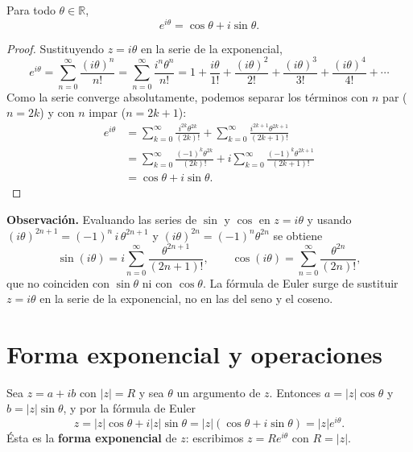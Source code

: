 \documentclass[12pt,a4paper]{book}
\begin{document}
  \begin{teorema}
    Para todo $\theta\in\mathbb{R}$,
    \begin{equation*}
      e^{i\theta}=\cos\theta+i\sin\theta.
    \end{equation*}
  \end{teorema}

  \begin{proof}
    Sustituyendo $z=i\theta$ en la serie de la exponencial,
    \begin{equation*}
      e^{i\theta}=\sum_{n=0}^{\infty}\frac{(i\theta)^n}{n!}=\sum_{n=0}^{\infty}\frac{i^n\theta^n}{n!}=1+\frac{i\theta}{1!}+\frac{(i\theta)^2}{2!}+\frac{(i\theta)^3}{3!}+\frac{(i\theta)^4}{4!}+\cdots
    \end{equation*}
    Como la serie converge absolutamente, podemos separar los términos con $n$ par ($n=2k$) y con $n$ impar ($n=2k+1$):
    \begin{align*}
      e^{i\theta} & =\sum_{k=0}^{\infty}\frac{i^{2k}\theta^{2k}}{(2k)!}+\sum_{k=0}^{\infty}\frac{i^{2k+1}\theta^{2k+1}}{(2k+1)!} \\
                  & =\sum_{k=0}^{\infty}\frac{(-1)^k\theta^{2k}}{(2k)!}+i\sum_{k=0}^{\infty}\frac{(-1)^k\theta^{2k+1}}{(2k+1)!}    \\
                  & =\cos\theta+i\sin\theta.
    \end{align*}
  \end{proof}

  \textbf{Observación.} Evaluando las series de $\sin$ y $\cos$ en $z=i\theta$ y usando $(i\theta)^{2n+1}=(-1)^n\,i\,\theta^{2n+1}$ y $(i\theta)^{2n}=(-1)^n\theta^{2n}$ se obtiene
  \begin{equation*}
    \sin(i\theta)=i\sum_{n=0}^{\infty}\frac{\theta^{2n+1}}{(2n+1)!}, \qquad \cos(i\theta)=\sum_{n=0}^{\infty}\frac{\theta^{2n}}{(2n)!},
  \end{equation*}
  que no coinciden con $\sin\theta$ ni con $\cos\theta$. La fórmula de Euler surge de sustituir $z=i\theta$ en la serie de la exponencial, no en las del seno y el coseno.

  \section{Forma exponencial y operaciones}

  Sea $z=a+ib$ con $|z|=R$ y sea $\theta$ un argumento de $z$. Entonces $a=|z|\cos\theta$ y $b=|z|\sin\theta$, y por la fórmula de Euler
  \begin{equation*}
    z=|z|\cos\theta+i|z|\sin\theta=|z|(\cos\theta+i\sin\theta)=|z|e^{i\theta}.
  \end{equation*}
  Ésta es la \textbf{forma exponencial} de $z$: escribimos $z=Re^{i\theta}$ con $R=|z|$.
\end{document}
